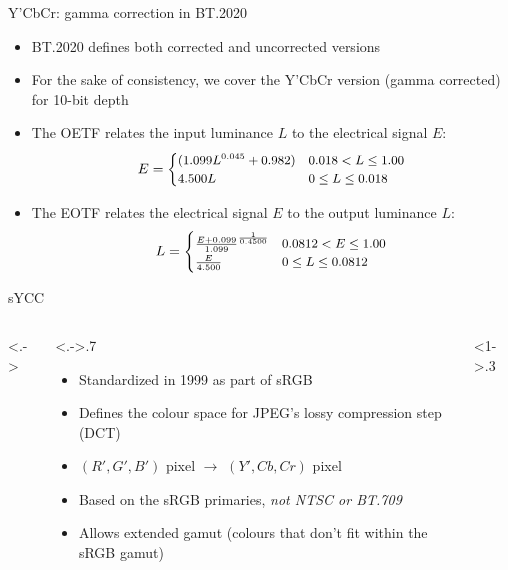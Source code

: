 \documentclass[aspectratio=169,handout,usepdftitle=false]{fireshonks}
\begin{document}
\begin{frame}{Y'CbCr: gamma correction in BT.2020}
    \begin{itemize}
        \item BT.2020 defines both corrected and uncorrected versions
        \item For the sake of consistency, we cover the Y'CbCr version (gamma corrected) for 10-bit depth
        \item The OETF relates the input luminance $L$ to the electrical signal $E$: \begin{equation}
                  \small
                  E = \begin{cases}
                      (1.099L^{0.045} + 0.982) & 0.018 < L \leq 1.00 \\
                      4.500L                   & 0 \leq L \leq 0.018
                  \end{cases}
              \end{equation}
        \item The EOTF relates the electrical signal $E$ to the output luminance $L$: \begin{equation}
                  \small
                  L = \begin{cases}
                      \frac{E + 0.099}{1.099}^\frac{1}{0.4500} & 0.0812 < E \leq 1.00 \\
                      \frac{E}{4.500}                          & 0 \leq L \leq 0.0812
                  \end{cases}
              \end{equation}
    \end{itemize}
\end{frame}
\begin{frame}{sYCC}
    \begin{columns}<.->
        \begin{column}<.->{.7\textwidth}
            \begin{itemize}
                \item Standardized in 1999 as part of sRGB \autocite{srgb2002}
                \item Defines the colour space for JPEG's lossy compression step (DCT)
                \item $(R', G', B')$ pixel $\rightarrow$ $(Y', Cb, Cr)$ pixel
                \item Based on the sRGB primaries, \emph{not NTSC or BT.709}
                \item Allows extended gamut (colours that don't fit within the sRGB gamut)
            \end{itemize}
        \end{column}
        \begin{column}<1->{.3\textwidth}
        \end{column}
    \end{columns}
\end{frame}
\end{document}
